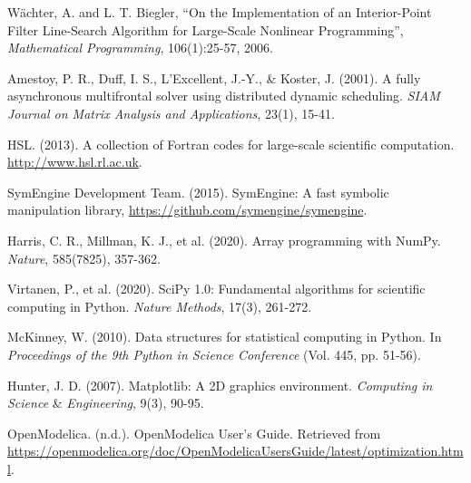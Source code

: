 \documentclass[12pt]{article}
\begin{document}
\newpage
\fancyhead[R]{}
\thispagestyle{fancy}

\begin{thebibliography}{9}
	
	
	
	Wächter, A. and L. T. Biegler, “On the Implementation of an Interior-Point Filter Line-Search Algorithm for Large-Scale Nonlinear Programming”, \textit{Mathematical Programming}, 106(1):25-57, 2006.
	
	Amestoy, P. R., Duff, I. S., L’Excellent, J.-Y., \& Koster, J. (2001). A fully asynchronous multifrontal solver using distributed dynamic scheduling. \textit{SIAM Journal on Matrix Analysis and Applications}, 23(1), 15-41.
	
	HSL. (2013). A collection of Fortran codes for large-scale scientific computation. \url{http://www.hsl.rl.ac.uk}.
	
	SymEngine Development Team. (2015). SymEngine: A fast symbolic manipulation library, \url{https://github.com/symengine/symengine}.
	
	Harris, C. R., Millman, K. J., et al. (2020). Array programming with NumPy. \textit{Nature}, 585(7825), 357-362.
	
	Virtanen, P., et al. (2020). SciPy 1.0: Fundamental algorithms for scientific computing in Python. \textit{Nature Methods}, 17(3), 261-272.
	
	McKinney, W. (2010). Data structures for statistical computing in Python. In \textit{Proceedings of the 9th Python in Science Conference} (Vol. 445, pp. 51-56).
	
	Hunter, J. D. (2007). Matplotlib: A 2D graphics environment. \textit{Computing in Science} \& \textit{Engineering}, 9(3), 90-95.
	
	OpenModelica. (n.d.). OpenModelica User's Guide. Retrieved from \url{https://openmodelica.org/doc/OpenModelicaUsersGuide/latest/optimization.html}.
	
\end{thebibliography}
\end{document}
